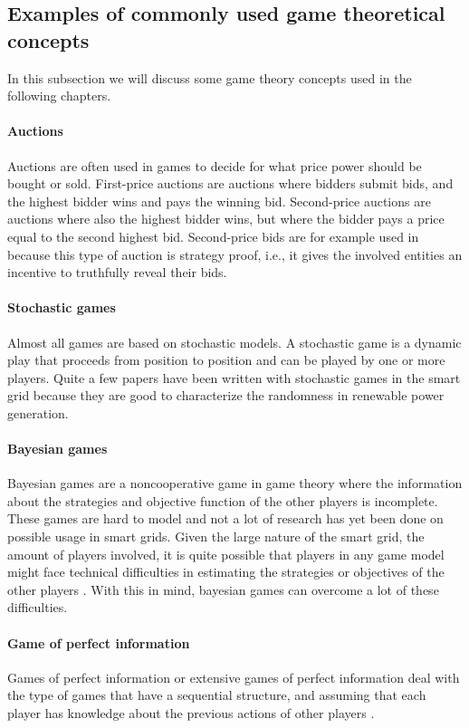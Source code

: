 \subsection{Examples of commonly used game theoretical concepts}
In this subsection we will discuss some game theory concepts used in the following chapters. 

\paragraph{Auctions}
Auctions are often used in games to decide for what price power should be bought or sold. First-price auctions are auctions where bidders submit bids, and the highest bidder wins and pays the winning bid. Second-price auctions are auctions where also the highest bidder wins, but where the bidder pays a price equal to the second highest bid. Second-price bids are for example used in \cite{SaadHanPoorEtAl2011} because this type of auction is strategy proof, i.e., it gives the involved entities an incentive to truthfully reveal their bids.
\paragraph{Stochastic games}
Almost all games are based on stochastic models. A stochastic game is a dynamic play that proceeds from position to position \cite{Shapley1953} and can be played by one or more players. Quite a few papers have been written with stochastic games in the smart grid \cite{LiangZhuang2014} because they are good to characterize the randomness in renewable power generation.  
\paragraph{Bayesian games}
Bayesian games are a noncooperative game in game theory where the information about the strategies and objective function of the other players is incomplete. These games are hard to model and not a lot of research has yet been done on possible usage in smart grids. Given the large nature of the smart grid, the amount of players involved, it is quite possible that players in any game model might face technical difficulties in estimating the strategies or objectives of the other players \cite{keypaper}. With this in mind, bayesian games can overcome a lot of these difficulties. 

\paragraph{Game of perfect information}
Games of perfect information or extensive games of perfect information deal with the type of games that have a sequential structure, and assuming that each player has knowledge about the previous actions of other players \cite{CourseInGameTheory}.

